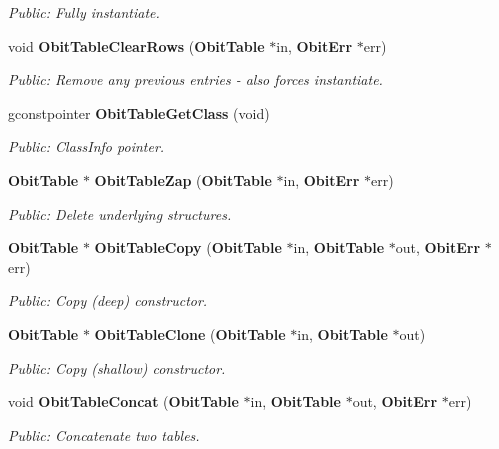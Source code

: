 \begin{CompactItemize}
\begin{CompactList}\small\item\em Public: Fully instantiate. \item\end{CompactList}\item 
void {\bf Obit\-Table\-Clear\-Rows} ({\bf Obit\-Table} $\ast$in, {\bf Obit\-Err} $\ast$err)
\begin{CompactList}\small\item\em Public: Remove any previous entries - also forces instantiate. \item\end{CompactList}\item 
gconstpointer {\bf Obit\-Table\-Get\-Class} (void)
\begin{CompactList}\small\item\em Public: Class\-Info pointer. \item\end{CompactList}\item 
{\bf Obit\-Table} $\ast$ {\bf Obit\-Table\-Zap} ({\bf Obit\-Table} $\ast$in, {\bf Obit\-Err} $\ast$err)
\begin{CompactList}\small\item\em Public: Delete underlying structures. \item\end{CompactList}\item 
{\bf Obit\-Table} $\ast$ {\bf Obit\-Table\-Copy} ({\bf Obit\-Table} $\ast$in, {\bf Obit\-Table} $\ast$out, {\bf Obit\-Err} $\ast$err)
\begin{CompactList}\small\item\em Public: Copy (deep) constructor. \item\end{CompactList}\item 
{\bf Obit\-Table} $\ast$ {\bf Obit\-Table\-Clone} ({\bf Obit\-Table} $\ast$in, {\bf Obit\-Table} $\ast$out)
\begin{CompactList}\small\item\em Public: Copy (shallow) constructor. \item\end{CompactList}\item 
void {\bf Obit\-Table\-Concat} ({\bf Obit\-Table} $\ast$in, {\bf Obit\-Table} $\ast$out, {\bf Obit\-Err} $\ast$err)
\begin{CompactList}\small\item\em Public: Concatenate two tables. \item\end{CompactList}\item 

\end{CompactItemize}
